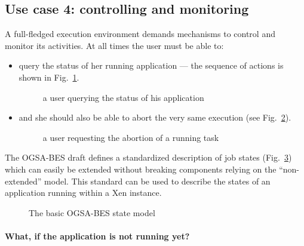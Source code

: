 \subsection{Use case 4: controlling and monitoring}

A  full-fledged execution  environment demands  mechanisms to  control and
monitor its activities.   At all times the user must be  able to:
\begin{itemize}
\item  query the status  of her  running application  --- the  sequence of
  actions is shown in Fig.~\ref{fig:seq-status-query-1}.
  \begin{figure}[htbp]
    \begin{center}
    \end{center}
    \caption[Querying the status]{a user querying the status of his application}
    \label{fig:seq-status-query-1}
  \end{figure}
\item and  she should also be able  to abort the very  same execution (see
  Fig.~\ref{fig:seq-abort-task-1}).
  \begin{figure}[htbp]
    \begin{center}
    \end{center}
    \caption[Aborting a running task]{a user requesting the abortion of a
      running task}
    \label{fig:seq-abort-task-1}
  \end{figure}
\end{itemize}

The OGSA-BES  draft \cite{ogsa-bes} defines a  standardized description of
job states (Fig.~\ref{fig:ogsa-bes-model-1})  which can easily be extended
without breaking  components relying on the  ``non-extended'' model.  This
standard  can be used  to describe  the states  of an  application running
within a Xen instance.

\begin{figure}[htbp]
  \begin{center}
  \end{center}
  \caption{The basic OGSA-BES state model}
  \label{fig:ogsa-bes-model-1}
\end{figure}


\paragraph{What, if the application is not running yet?}

